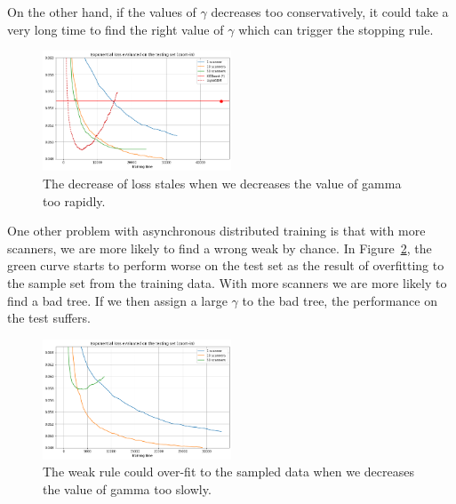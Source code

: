 On the other hand, if the values of $\gamma$ decreases too conservatively,
it could take a very long time to find the right value of $\gamma$ which can trigger the stopping rule.

\begin{figure}
\centering
    \includegraphics[width=0.5\textwidth]{paper/figs/stale.png}
    \caption{The decrease of loss stales when we decreases the value of gamma too rapidly.}\label{fig:rapid-gamma}
    \vspace{0pt}
\end{figure}

One other problem with asynchronous distributed training is that
with more scanners, we are more likely to find a wrong weak by chance.
In Figure~\ref{fig:overfit},
the green curve starts to perform worse on the test set as the result of overfitting
to the sample set from the training data.
With more scanners we are more likely to find a bad tree. If we then assign a large $\gamma$ to the
bad tree, the performance on the test suffers.

\begin{figure}
\centering
    \includegraphics[width=0.5\textwidth]{paper/figs/overfit.png}
    \caption{The weak rule could over-fit to the sampled data when we decreases the value of gamma too slowly.}\label{fig:overfit}
    \vspace{0pt}
\end{figure}